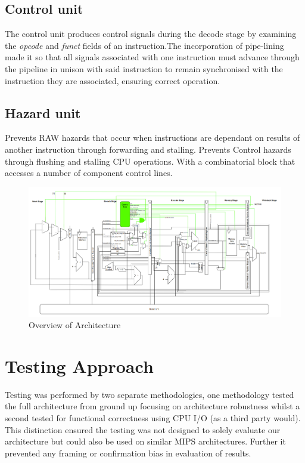 \documentclass[10pt]{datasheet}
\begin{document}
\subsection{Control unit}
The control unit produces control signals during the decode stage by examining the \textit{opcode} and \textit{funct} fields of an instruction.The incorporation of pipe-lining made it so that all signals associated with one instruction must advance through the pipeline in unison with said instruction to remain synchronised with the instruction they are associated, ensuring correct operation. 



\subsection{Hazard unit} 
Prevents  RAW hazards that occur when instructions are dependant on results of another instruction through forwarding and stalling. Prevents Control hazards through flushing and stalling CPU operations. With a combinatorial block that accesses a number of component control lines.




\begin{figure}[h]
    \includegraphics[scale=0.75]{Assets/circuit.PNG}
    \centering
    \captionsetup{justification=centering}
    \caption{Overview of Architecture}
\end{figure}


\newpage

\twocolumn

\section{Testing Approach}
\smallbreak
Testing was performed by two separate methodologies, one methodology tested the full architecture from ground up focusing on architecture robustness whilst a second tested for functional correctness using CPU I/O (as a third party would). This distinction ensured the testing was not designed to solely evaluate our architecture but could also be used on similar MIPS architectures. Further it prevented any framing or confirmation bias in evaluation of results.
\smallbreak
\end{document}
